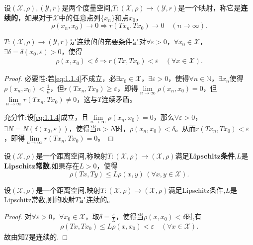 \documentclass[../../main.tex]{subfiles}%
\begin{document}
\begin{definition}
设$(\mathscr{X}, \rho), (\mathscr{Y}, r)$是两个度量空间,$T: (\mathscr{X}, \rho) \to (\mathscr{Y}, r)$是一个映射，称它是\textbf{连续的}，如果对于$\mathscr{X}$中的任意点列$\{x_n\}$和点$x_0$，
$$\rho(x_n, x_0) \to 0 \Rightarrow r(Tx_n, Tx_0) \to 0 \quad (n \to \infty).$$
\end{definition}

\begin{proposition}[连续映射充要条件]\label{proposition:距离空间的连续映射充要条件}
$T: (\mathscr{X}, \rho) \to (\mathscr{Y}, r)$是连续的的充要条件是对$\forall \varepsilon > 0$，$\forall x_0 \in \mathscr{X}$，$\exists \delta = \delta(x_0, \varepsilon) > 0$，使得
\begin{align}
\label{eq:1.1.4}
\rho(x, x_0) < \delta \Rightarrow r(Tx, Tx_0) < \varepsilon \quad (\forall x \in \mathscr{X}).
\end{align}
\end{proposition}
\begin{proof}

{\heiti 必要性:}若\eqref{eq:1.1.4}不成立，必$\exists x_0 \in \mathscr{X}$，$\exists \varepsilon > 0$，使得$\forall n \in \mathbb{N}$，$\exists x_n$使得$\rho(x_n, x_0) < \frac{1}{n}$，但$r(Tx_n, Tx_0) \geqslant \varepsilon$，即得$\lim\limits_{n \to \infty} \rho(x_n, x_0) = 0$，但$\lim\limits_{n \to \infty} r(Tx_n, Tx_0) \neq 0$，这与$T$连续矛盾。

{\heiti 充分性:}设\eqref{eq:1.1.4}成立，且$\lim\limits_{n \to \infty} \rho(x_n, x_0) = 0$，那么$\forall \varepsilon > 0$，$\exists N = N(\delta(x_0, \varepsilon))$，使得当$n > N$时，$\rho(x_n, x_0) < \delta$。从而$r(Tx_n, Tx_0) < \varepsilon$，即得$\lim\limits_{n \to \infty} r(Tx_n, Tx_0) = 0$。

\end{proof}

\begin{definition}
设$(\mathscr{X},\rho)$是一个距离空间,称映射$T:(\mathscr{X},\rho) \to (\mathscr{X},\rho)$满足$\mathbf{Lipschitz}$\textbf{条件},$L$是$\mathbf{Lipschitz}$\textbf{常数}.如果存在$L >0$，使得$$\rho(Tx,Ty) \leqslant L\rho(x,y)\,(\forall x,y \in \mathscr{X}).$$
\end{definition}

\begin{theorem}\label{theorem:满足Lipschitz条件的映射必连续}
设$(\mathscr{X},\rho)$是一个距离空间,映射$T:(\mathscr{X},\rho) \to (\mathscr{X},\rho)$满足Lipschitz条件,$L$是Lipschitz常数,则的映射$T$是连续的。
\end{theorem}
\begin{proof}

对$\forall \varepsilon > 0$，$\forall x_0 \in \mathscr{X}$，取$\delta=\frac{\varepsilon}{L}$，使得当$\rho(x, x_0) < \delta$时,有
\begin{align*}
\rho \left( Tx,Tx_0 \right) \leqslant L\rho \left( x,x_0 \right) <\varepsilon \quad \left( \forall x\in \mathscr{X} \right) .
\end{align*}
故由知$T$是连续的.

\end{proof}
\end{document}
